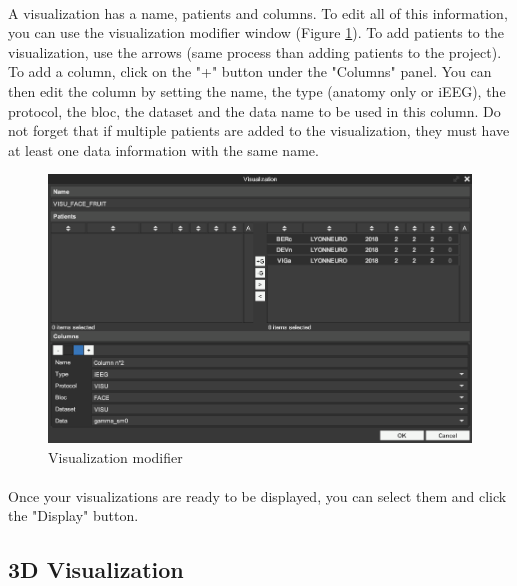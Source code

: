 \documentclass[a4paper]{article}
\begin{document}
\paragraph{} A visualization has a name, patients and columns. To edit all of this information, you can use the visualization modifier window (Figure \ref{visuModifierUI}). To add patients to the visualization, use the arrows (same process than adding patients to the project). To add a column, click on the "+" button under the "Columns" panel. You can then edit the column by setting the name, the type (anatomy only or iEEG), the protocol, the bloc, the dataset and the data name to be used in this column. Do not forget that if multiple patients are added to the visualization, they must have at least one data information with the same name.
\begin{figure}[H]
\begin{center}
\includegraphics[scale=0.3]{VisualizationModifier.png}
\end{center}
\caption{\label{visuModifierUI}Visualization modifier}
\end{figure}
\paragraph{} Once your visualizations are ready to be displayed, you can select them and click the "Display" button.
\subsection{3D Visualization}
\end{document}
